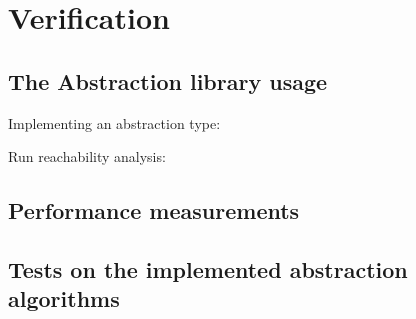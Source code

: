 \chapter{Verification}
\label{sec:verifikacio}

\section{The Abstraction library usage}
Implementing an abstraction type:

Run reachability analysis:

\section{Performance measurements}


\section{Tests on the implemented abstraction algorithms}


